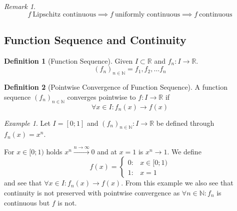 \documentclass[english,titlepage]{uzhpub}
\theoremstyle{definition}
\newtheorem{definition}{Definition}[section]
\theoremstyle{plain}
\theoremstyle{remark}
\newtheorem*{remark}{Remark}
\theoremstyle{example}
\newtheorem*{example}{Example}
\begin{document}
   \begin{remark}
      \[f~\text{Lipschitz continuous} \implies f~\text{uniformly continuous} \implies f~\text{continuous}\]
   \end{remark}


   \subsection{Function Sequence and Continuity}
   \begin{definition}[Function Sequence]
      Given \(I \subset \mathbb{R}\) and \(f_n: I \to \mathbb{R}\).
      \[(f_n)_{n \in \mathbb{N}} = f_1, f_2, \ldots f_n\]
   \end{definition}

   \begin{definition}[Pointwise Convergence of Function Sequence]
      A function sequence \((f_n)_{n \in \mathbb{N}}\) converges pointwise to \(f: I \to \mathbb{R}\) if
      \[\forall x \in I: f_n(x) \to f(x)\]
   \end{definition}
   \begin{example}
      Let \(I = [0;1]\) and \((f_n)_{n \in \mathbb{N}}: I \to \mathbb{R}\) be defined through \(f_n(x) = x^n\).

      For \(x \in [0;1)\) holds \(x^n \xrightarrow{n \to \infty} 0\) and at \(x = 1\) is \(x^n \to 1\).
      We define
      \[f(x) = \begin{cases}0:& x \in [0; 1)\\ 1: & x = 1\end{cases}\]
      and see that \(\forall x \in I: f_n(x) \to f(x)\).
      From this example we also see that continuity is not preserved with pointwise convergence as \(\forall n \in \mathbb{N}: f_n\) is continuous but \(f\) is not.
   \end{example}

   \begin{center}
      
   \end{center}
\end{document}
